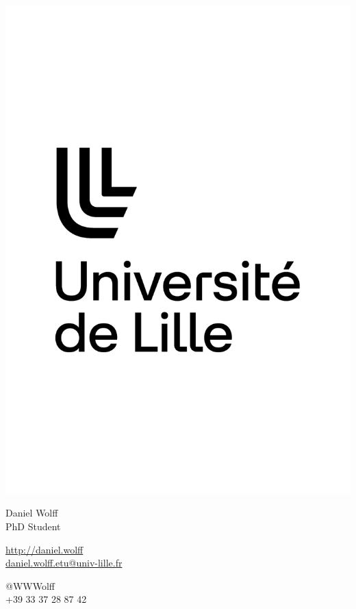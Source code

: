 \documentclass{article}
\begin{document}
\centering \includegraphics[width=.25\linewidth]{logo}\\[5pt]

\parbox{2in}{\Large \centering Daniel Wolff\\[1pt]
\normalsize PhD Student}

\vfill

\raggedright
\begin{multicols}{2}
\href{http://daniel.wolff}{http://daniel.wolff}\\
\href{mailto:daniel.wolff.etu@univ-lille.fr}{daniel.wolff.etu@univ-lille.fr}

\columnbreak
\raggedleft
@WWWolff\\
+39 33 37 28 87 42
\end{multicols}
\end{document}
